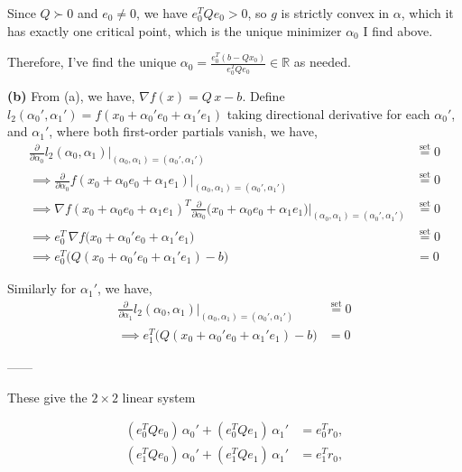 \documentclass[12pt]{article}
\begin{document}
Since $Q\succ0$ and $e_0\neq0$, we have $e_0^T Q e_0>0$, so $g$ is strictly convex in $\alpha$, which it has exactly one critical point, which is the unique minimizer $\alpha_0$ I find above.

Therefore, I've find the unique $\displaystyle \alpha_0=\frac{e_0^T(b-Qx_0)}{e_0^TQe_0} \in \mathbb{R}$ as needed.

\vspace{10pt}
\noindent
\textbf{(b)}
From (a), we have, $\nabla f(x) = Q\,x - b$. Define $l_2(\alpha_0',\alpha_1') = f(x_0 + \alpha_0' e_0 + \alpha_1'e_1)$ taking directional derivative for each $\alpha_0'$, and $\alpha_1'$, where both first-order partials vanish, we have, 
\begin{align*}
\frac{\partial}{\partial \alpha_0}l_2(\alpha_0,\alpha_1)\Big|_{(\alpha_0,\alpha_1)=(\alpha_0',\alpha_1')} &\overset{\text{set}}{=} 0 \\
\implies \frac{\partial}{\partial \alpha_0} f(x_0 + \alpha_0 e_0 + \alpha_1 e_1)\Big|_{(\alpha_0,\alpha_1)=(\alpha_0',\alpha_1')} &\overset{\text{set}}{=} 0 \\
\implies \nabla f(x_0 + \alpha_0 e_0 + \alpha_1 e_1)^{\!T} \frac{\partial}{\partial\alpha_0}\big(x_0 + \alpha_0 e_0 + \alpha_1 e_1\big)\Big|_{(\alpha_0,\alpha_1)=(\alpha_0',\alpha_1')}&\overset{\text{set}}{=} 0 \\
\implies e_0^{T}\,\nabla f\big(x_0+\alpha_0' e_0+\alpha_1' e_1\big) &\overset{\text{set}}{=} 0 \\
\implies e_0^{T}\big(Q(x_0+\alpha_0' e_0+\alpha_1' e_1)-b\big) &= 0
\end{align*}

Similarly for $\alpha_1'$, we have, 
\begin{align*}
\frac{\partial}{\partial \alpha_1}l_2(\alpha_0,\alpha_1)\Big|_{(\alpha_0,\alpha_1)=(\alpha_0',\alpha_1')} &\overset{\text{set}}{=} 0 \\
\implies e_1^{T}\big(Q(x_0+\alpha_0' e_0+\alpha_1' e_1)-b\big) &= 0
\end{align*}



------

These give the $2\times2$ linear system

$$
\begin{aligned}
(e_0^TQe_0)\,\alpha_0' + (e_0^TQe_1)\,\alpha_1' &= e_0^T r_0,\\
(e_1^TQe_0)\,\alpha_0' + (e_1^TQe_1)\,\alpha_1' &= e_1^T r_0,
\end{aligned}
$$
\end{document}
